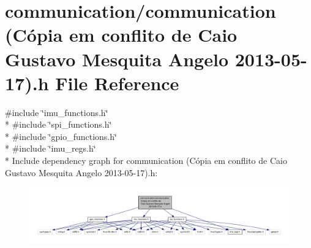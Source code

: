 \hypertarget{communication_01_07C_xC3_xB3pia_01em_01conflito_01de_01Caio_01Gustavo_01Mesquita_01Angelo_012013-05-17_08_8h}{\section{communication/communication (Cópia em conflito de Caio Gustavo Mesquita Angelo 2013-\/05-\/17).h File Reference}
\label{communication_01_07C_xC3_xB3pia_01em_01conflito_01de_01Caio_01Gustavo_01Mesquita_01Angelo_012013-05-17_08_8h}
}
{\ttfamily \#include \char`\"{}imu\-\_\-functions.\-h\char`\"{}}\\*
{\ttfamily \#include \char`\"{}spi\-\_\-functions.\-h\char`\"{}}\\*
{\ttfamily \#include \char`\"{}gpio\-\_\-functions.\-h\char`\"{}}\\*
{\ttfamily \#include \char`\"{}imu\-\_\-regs.\-h\char`\"{}}\\*
Include dependency graph for communication (Cópia em conflito de Caio Gustavo Mesquita Angelo 2013-\/05-\/17).h\-:\nopagebreak
\begin{figure}[H]
\begin{center}
\leavevmode
\includegraphics[width=350pt]{communication_01_07C_xC3_xB3pia_01em_01conflito_01de_01Caio_01Gustavo_01Mesquita_01Angelo_012013-05-17_08_8h__incl}
\end{center}
\end{figure}

